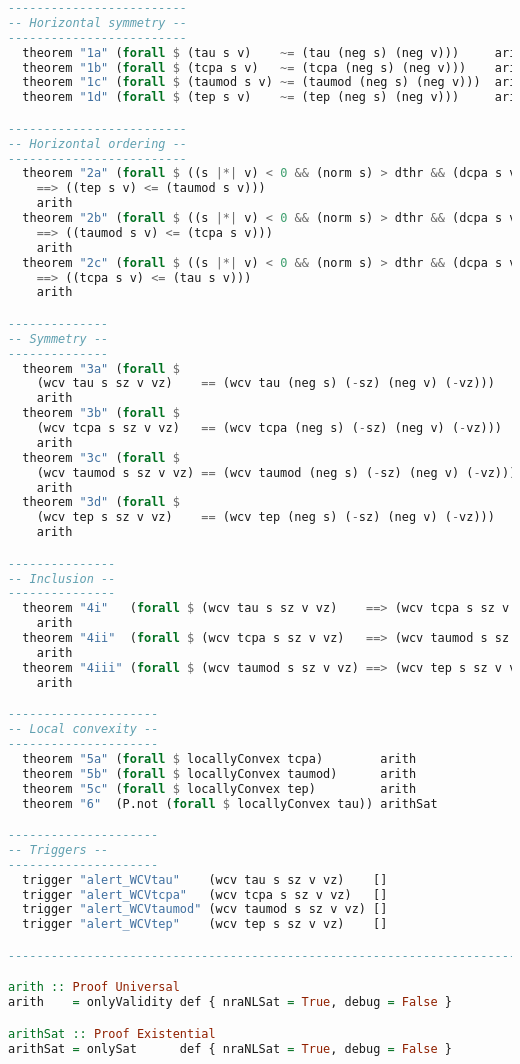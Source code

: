 \begin{lstlisting}[language=Haskell]
-------------------------
-- Horizontal symmetry --
-------------------------
  theorem "1a" (forall $ (tau s v)    ~= (tau (neg s) (neg v)))     arith
  theorem "1b" (forall $ (tcpa s v)   ~= (tcpa (neg s) (neg v)))    arith
  theorem "1c" (forall $ (taumod s v) ~= (taumod (neg s) (neg v)))  arith
  theorem "1d" (forall $ (tep s v)    ~= (tep (neg s) (neg v)))     arith

-------------------------
-- Horizontal ordering --
-------------------------
  theorem "2a" (forall $ ((s |*| v) < 0 && (norm s) > dthr && (dcpa s v) <= dthr)
    ==> ((tep s v) <= (taumod s v)))
    arith
  theorem "2b" (forall $ ((s |*| v) < 0 && (norm s) > dthr && (dcpa s v) <= dthr)
    ==> ((taumod s v) <= (tcpa s v)))
    arith
  theorem "2c" (forall $ ((s |*| v) < 0 && (norm s) > dthr && (dcpa s v) <= dthr)
    ==> ((tcpa s v) <= (tau s v)))
    arith

--------------
-- Symmetry --
--------------
  theorem "3a" (forall $
    (wcv tau s sz v vz)    == (wcv tau (neg s) (-sz) (neg v) (-vz)))
    arith
  theorem "3b" (forall $
    (wcv tcpa s sz v vz)   == (wcv tcpa (neg s) (-sz) (neg v) (-vz)))
    arith
  theorem "3c" (forall $
    (wcv taumod s sz v vz) == (wcv taumod (neg s) (-sz) (neg v) (-vz)))
    arith
  theorem "3d" (forall $
    (wcv tep s sz v vz)    == (wcv tep (neg s) (-sz) (neg v) (-vz)))
    arith

---------------
-- Inclusion --
---------------
  theorem "4i"   (forall $ (wcv tau s sz v vz)    ==> (wcv tcpa s sz v vz))
    arith
  theorem "4ii"  (forall $ (wcv tcpa s sz v vz)   ==> (wcv taumod s sz v vz ))
    arith
  theorem "4iii" (forall $ (wcv taumod s sz v vz) ==> (wcv tep s sz v vz))
    arith

---------------------
-- Local convexity --
---------------------
  theorem "5a" (forall $ locallyConvex tcpa)        arith
  theorem "5b" (forall $ locallyConvex taumod)      arith
  theorem "5c" (forall $ locallyConvex tep)         arith
  theorem "6"  (P.not (forall $ locallyConvex tau)) arithSat

---------------------
-- Triggers --
---------------------
  trigger "alert_WCVtau"    (wcv tau s sz v vz)    []
  trigger "alert_WCVtcpa"   (wcv tcpa s sz v vz)   []
  trigger "alert_WCVtaumod" (wcv taumod s sz v vz) []
  trigger "alert_WCVtep"    (wcv tep s sz v vz)    []

--------------------------------------------------------------------------------

arith :: Proof Universal
arith    = onlyValidity def { nraNLSat = True, debug = False }

arithSat :: Proof Existential
arithSat = onlySat      def { nraNLSat = True, debug = False }

\end{lstlisting}
